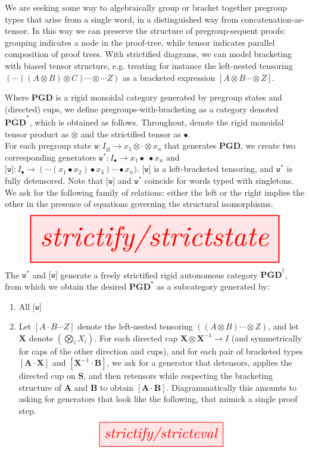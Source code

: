 We are seeking some way to algebraically group or bracket together pregroup types that arise from a single word, in a distinguished way from concatenation-as-tensor. In this way we can preserve the structure of pregroup-sequent proofs: grouping indicates a node in the proof-tree, while tensor indicates parallel composition of proof trees. With strictified diagrams, we can model bracketing with biased tensor structure, e.g. treating for instance the left-nested tensoring $(\cdots((A \otimes B) \otimes C) \cdots \otimes \cdots Z)$ as a bracketed expression $[A \otimes B \cdots \otimes Z]$.

\begin{construction}\label{cons:bracketing}
Where $\mathbf{PGD}$ is a rigid monoidal category generated by pregroup states and (directed) cups, we define pregroups-with-bracketing as a category denoted $\overline{\mathbf{PGD}}^*$, which is obtained as follows. Throughout, denote the rigid monoidal tensor product as $\otimes$ and the strictified tensor as $\bullet$.\\

For each pregroup state $\texttt{w} : I_\otimes \rightarrow x_1 \otimes \cdot \otimes x_n$ that generates $\mathbf{PGD}$, we create two corresponding generators $\texttt{w}^* : I_\bullet \rightarrow x_1 \bullet \cdot \bullet x_n$ and $\texttt{[w]} : I_\bullet \rightarrow (\cdots(x_1 \bullet x_2) \bullet x_3) \cdots \bullet x_n)$. $\texttt{[w]}$ is a left-bracketed tensoring, and $\texttt{w}^*$ is fully detensored. Note that $\texttt{[w]}$ and $\texttt{w}^*$ coincide for words typed with singletons. We ask for the following family of relations: either the left or the right implies the other in the presence of equations governing the structural isomorphisms.
\[\resizebox{\textwidth}{!}{\tikzfig{strictify/strictstate}}\]
The $\texttt{w}^*$ and $\texttt{[w]}$ generate a freely strictified rigid autonomous category $\overline{\mathbf{PGD}}^\dagger$, from which we obtain the desired $\overline{\mathbf{PGD}}^\star$ as a subcategory generated by:

\begin{enumerate}
\item{All $\texttt{[w]}$}
\item Let $[A \cdot B \cdots Z]$ denote the left-nested tensoring $((A \otimes B) \cdots \otimes Z)$, and let $\mathbf{X}$ denote $(\bigotimes\limits_i X_i)$. For each directed cap $\mathbf{X} \otimes \mathbf{X}^{-1} \rightarrow I$ (and symmetrically for caps of the other direction and cups), and for each pair of bracketed types $[\mathbf{A} \cdot \mathbf{X}]$ and $[\mathbf{X}^{-1} \cdot \mathbf{B}]$, we ask for a generator that detensors, applies the directed cup on \textbf{S}, and then retensors while respecting the bracketing structure of \textbf{A} and \textbf{B} to obtain $[\mathbf{A} \cdot \mathbf{B}]$. Diagrammatically this amounts to asking for generators that look like the following, that mimick a single proof step.
\[\resizebox{0.5\textwidth}{!}{\tikzfig{strictify/stricteval}}\]
\end{enumerate}
\end{construction}

